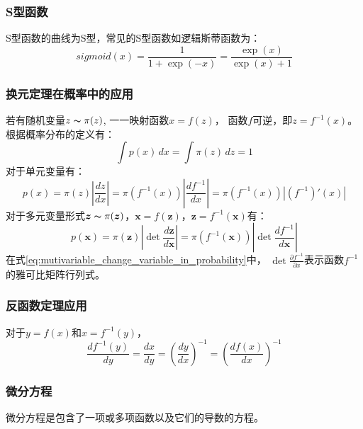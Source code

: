 \subsubsection{S型函数}
S型函数的曲线为S型，常见的S型函数如逻辑斯蒂函数为：
\begin{equation}
    \label{eq:sigmoid_function}
    sigmoid(x)= \frac{1}{1+\exp(-x)}=\frac{\exp(x)}{\exp(x)+1}
\end{equation}

\subsubsection{换元定理在概率中的应用}

若有随机变量{$z\thicksim \pi(z)$}, 
一一映射函数{$x=f(z)$}，
函数{$f$}可逆，即{$z=f^{-1}(x)$}。
根据概率分布的定义有：
\begin{equation}
    \int p(x)  \,dx = \int \pi(z)\,dz =1
\end{equation}
对于单元变量有：
\begin{equation}
    p(x)=\pi(z)\left\rvert\frac{dz}{dx}\right\rvert
    =\pi(f^{-1}(x))\left\rvert\frac{df^{-1}}{dx}\right\rvert
    =\pi(f^{-1}(x))\left\rvert(f^{-1})'(x)\right\rvert
\end{equation}
对于多元变量形式{$\bm{z}\thicksim \pi(\bm{z})$}，{$\bm{x}=f(\bm{z})$}，{$\bm{z}=f^{-1}(\bm{x})$}有：
\begin{equation}
    \label{eq:mutivariable_change_variable_in_probability}
    p(\bm{x})=\pi(\bm{z})\left\rvert \det \frac{d\bm{z}}{d\bm{x}}\right\rvert
    =\pi(f^{-1}(\bm{x}))\left\vert \det \frac{df^{-1}}{d\bm{x}} \right\rvert
\end{equation}
在式{\ref{eq:mutivariable_change_variable_in_probability}}中，
{$\det  \frac{\partial f^{-1}}{\partial x}$}表示函数{$f^{-1}$}的雅可比矩阵行列式。

\subsubsection{反函数定理应用}
对于{$y=f(x)$}和{$x=f^{-1}(y)$}，
\begin{equation}
    \label{eq:inverse_function_theorem_application}
    \frac{df^{-1}(y)}{dy}
    =\frac{dx}{dy}
    ={\left(\frac{dy}{dx}\right)}^{-1}
    ={\left(\frac{df(x)}{dx}\right)}^{-1}
\end{equation}

\subsubsection{微分方程}
微分方程是包含了一项或多项函数以及它们的导数的方程。


